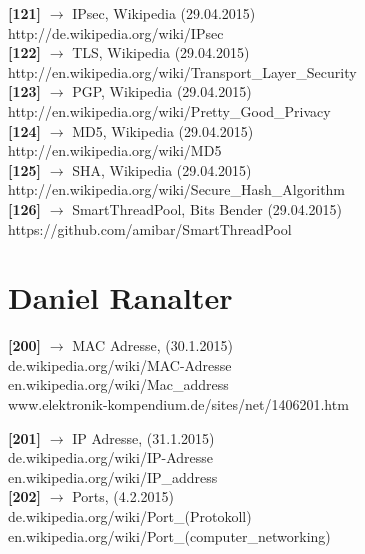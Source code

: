 \documentclass[12pt,a4paper]{report}
\begin{document}
\begin{onehalfspace}
\noindent
\textbf{[121]} $\rightarrow$ IPsec, Wikipedia (29.04.2015)\\
http://de.wikipedia.org/wiki/IPsec\\

\noindent
\textbf{[122]} $\rightarrow$ TLS, Wikipedia (29.04.2015)\\
http://en.wikipedia.org/wiki/Transport\_Layer\_Security\\

\noindent
\textbf{[123]} $\rightarrow$ PGP, Wikipedia (29.04.2015)\\
http://en.wikipedia.org/wiki/Pretty\_Good\_Privacy\\

\noindent
\textbf{[124]} $\rightarrow$ MD5, Wikipedia (29.04.2015)\\
http://en.wikipedia.org/wiki/MD5\\

\noindent
\textbf{[125]} $\rightarrow$ SHA, Wikipedia (29.04.2015)\\
http://en.wikipedia.org/wiki/Secure\_Hash\_Algorithm\\

\noindent
\textbf{[126]} $\rightarrow$ SmartThreadPool, Bits Bender (29.04.2015)\\
https://github.com/amibar/SmartThreadPool\\

\chapter{Daniel Ranalter}

\noindent
\textbf{[200]} $\rightarrow$  MAC Adresse, (30.1.2015)\\
de.wikipedia.org/wiki/MAC-Adresse\\
en.wikipedia.org/wiki/Mac\_address\\
www.elektronik-kompendium.de/sites/net/1406201.htm

\noindent
\textbf{[201]} $\rightarrow$  IP Adresse, (31.1.2015)\\
de.wikipedia.org/wiki/IP-Adresse\\
en.wikipedia.org/wiki/IP\_address\\

\noindent
\textbf{[202]} $\rightarrow$  Ports, (4.2.2015)\\
de.wikipedia.org/wiki/Port\_(Protokoll)\\
en.wikipedia.org/wiki/Port\_(computer\_networking)\\


\end{onehalfspace}
\end{document}
